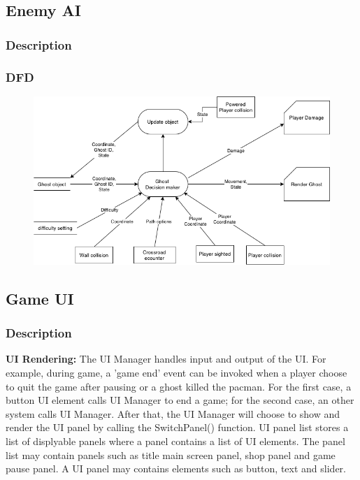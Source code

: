 \documentclass{article}
\begin{document}
\subsection{Enemy AI}
\subsubsection{Description}

\subsubsection{DFD}
\begin{figure}[H]
    \centering
    \includegraphics*[scale=0.4]{GhostAI_DFD.png}
\end{figure}
\subsection{Game UI}
\subsubsection{Description}
\textbf{UI Rendering:} The UI Manager handles input and output of the UI. For example, during game, a 'game end' event can be invoked when a player choose to quit the game after pausing or a ghost killed the pacman. For the first case, a button UI element calls UI Manager to end a game; for the second case, an other system calls UI Manager. After that, the UI Manager will choose to show and render the UI panel by calling the SwitchPanel() function. UI panel list stores a list of displyable panels where a panel contains a list of UI elements. The panel list may contain panels such as title main screen panel, shop panel and game pause panel. A UI panel may contains elements such as button, text and slider.
\end{document}

